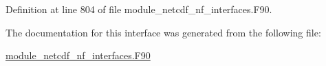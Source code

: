 Definition at line 804 of file module\+\_\+netcdf\+\_\+nf\+\_\+interfaces.\+F90.



The documentation for this interface was generated from the following file\+:\begin{DoxyCompactItemize}
\item 
\hyperlink{module__netcdf__nf__interfaces_8F90}{module\+\_\+netcdf\+\_\+nf\+\_\+interfaces.\+F90}\end{DoxyCompactItemize}
